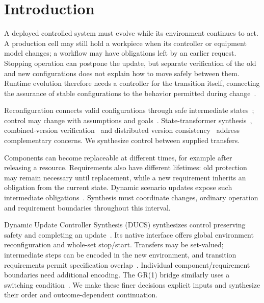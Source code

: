 \documentclass[acmsmall,screen,review,anonymous]{acmart}
\begin{document}

\maketitle

\section{Introduction}
\label{sec:introduction}

A deployed controlled system must evolve while its environment continues to act. A production cell may still hold a workpiece when its controller or equipment model changes; a workflow may have obligations left by an earlier request. Stopping operation can postpone the update, but separate verification of the old and new configurations does not explain how to move safely between them. Runtime evolution therefore needs a controller for the transition itself, connecting the assurance of stable configurations to the behavior permitted during change~\cite{Cheng2009SASRoadmap,Andersson2013SEAMSProcesses,Giuffrida2013SafeLiveUpdate,Sokolowski2022DynamicWorkflowUpdates}.

Reconfiguration connects valid configurations through safe intermediate states~\cite{KramerMagee1990Quiescence,CoullonEtAl2024Survey}; control may change with assumptions and goals~\cite{DIppolito2014MultiTierControl}. State-transformer synthesis~\cite{ZhaoEtAl2021ObjectTransformers}, combined-version verification~\cite{HaydenEtAl2012DSUCorrectness} and distributed version consistency~\cite{BaresiEtAl2017VersionConsistency} address complementary concerns. We synthesize control between supplied transfers.

Components can become replaceable at different times, for example after releasing a resource. Requirements also have different lifetimes: old protection may remain necessary until replacement, while a new requirement inherits an obligation from the current state. Dynamic scenario updates expose such intermediate obligations~\cite{Ghezzi2012DynamicScenarioUpdate,PanzicaLaManna2013CorrectnessDynamicUpdates}. Synthesis must coordinate changes, ordinary operation and requirement boundaries throughout this interval.

Dynamic Update Controller Synthesis (DUCS) synthesizes control preserving safety and completing an update~\cite{Nahabedian2016SEAMS,Nahabedian2020}. Its native interface offers global environment reconfiguration and whole-set stop/start. Transfers may be set-valued; intermediate steps can be encoded in the new environment, and transition requirements permit specification overlap~\cite[Sec.~4.2]{Nahabedian2020}. Individual component/requirement boundaries need additional encoding. The GR(1) bridge similarly uses a switching condition~\cite{Amram2022GR1DynamicUpdate}. We make these finer decisions explicit inputs and synthesize their order and outcome-dependent continuation.
\end{document}
